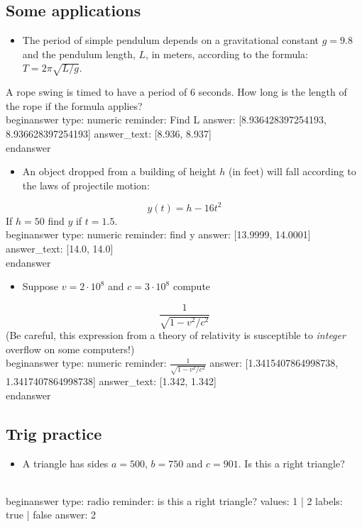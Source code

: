 \documentclass[12pt]{article}
\begin{document}
\subsection{Some applications}\begin{itemize}\item The period of simple pendulum depends on a gravitational constant   $g=9.8$ and the pendulum length, $L$, in meters, according to the formula:   $T=2\pi\sqrt{L/g}$.\end{itemize}\newline
A rope swing is timed to have a period of $6$ seconds. How long is   the length of the rope if the formula applies?
\\begin{answer}
    type: numeric
    reminder: Find L
    answer: [8.936428397254193, 8.936628397254193]
    answer_text: [8.936, 8.937] 
\\end{answer}
\begin{itemize}\item An object dropped from a building of height $h$ (in feet) will fall   according to the laws of projectile motion:\end{itemize}
$$
y(t) = h - 16t^2
$$
\newline
If $h=50$ find $y$ if $t=1.5$.
\\begin{answer}
    type: numeric
    reminder: find y
    answer: [13.9999, 14.0001]
    answer_text: [14.0, 14.0] 
\\end{answer}
\begin{itemize}\item Suppose $v = 2\cdot 10^8$ and $c = 3 \cdot 10^8$ compute\end{itemize}
$$
\frac{1}{\sqrt{1 - v^2/c^2}}
$$
\newline
(Be careful, this expression from a theory of relativity is susceptible to \textit{integer} overflow on some computers!)
\\begin{answer}
    type: numeric
    reminder: \( \frac{1}{\sqrt{1 - v^2/c^2}} \)
    answer: [1.3415407864998738, 1.3417407864998738]
    answer_text: [1.342, 1.342] 
\\end{answer}
\subsection{Trig practice}\begin{itemize}\item A triangle has sides $a=500$, $b=750$ and $c=901$. Is this a right triangle?\end{itemize}
\\begin{answer}
type: radio
reminder: is this a right triangle?
values: 1 | 2
labels: true | false
answer: 2
\end{document}
